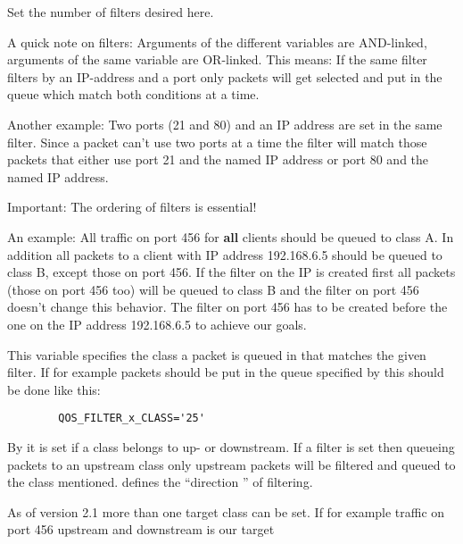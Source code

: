 \begin{description}

   Set the number of filters desired here.

   A quick note on filters:
   Arguments of the different variables are AND-linked, arguments of the
   same variable are OR-linked. This means: If the same filter filters by
   an IP-address and a port only packets will get selected and put in
   the queue which match both conditions at a time.

   Another example:
   Two ports (21 and 80) and an IP address are set in the same filter.
   Since a packet can't use two ports at a time the filter will match
   those packets that either use port 21 and the named IP address or
   port 80 and the named IP address.

   Important: The ordering of filters is essential!

   An example: All traffic on port 456 for \textbf{all} clients should be
   queued to class A. In addition all packets to a client with IP address
   192.168.6.5 should be queued to class B, except those on port 456.
   If the filter on the IP is created first all packets (those on port
   456 too) will be queued to class B and the filter on port 456 doesn't
   change this behavior. The filter on port 456 has to be created before
   the one on the IP address 192.168.6.5 to achieve our goals.


   This variable specifies the class a packet is queued in that matches
   the given filter. If for example packets should be put in the queue
   specified by  this should be
   done like this:

\begin{example}
\begin{verbatim}
        QOS_FILTER_x_CLASS='25'
\end{verbatim}
\end{example}

   By  it is set if a class belongs to
   up- or downstream. If a filter is set then queueing packets to an
   upstream class only upstream packets will be filtered and queued
   to the class mentioned.  defines
   the ``direction '' of filtering.

   As of version 2.1 more than one target class can be set. If for example
   traffic on port 456 upstream and downstream is our target


\end{description}
